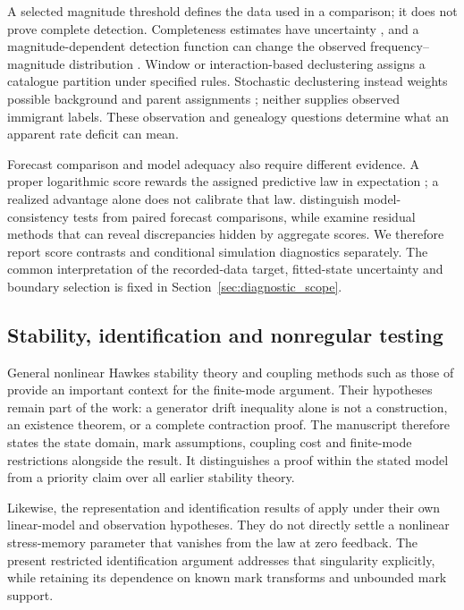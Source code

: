 A selected magnitude threshold defines the data used in a comparison; it does
not prove complete detection. Completeness estimates have uncertainty
\citep{WoessnerWiemer2005}, and a magnitude-dependent detection function can
change the observed frequency--magnitude distribution
\citep{Mignan2012}. Window or interaction-based declustering
\citep{GardnerKnopoff1974,Reasenberg1985} assigns a catalogue partition under
specified rules. Stochastic declustering instead weights possible background
and parent assignments \citep{ZhuangOgataVereJones2002}; neither supplies
observed immigrant labels. These observation and genealogy questions determine
what an apparent rate deficit can mean.

Forecast comparison and model adequacy also require different evidence.
A proper logarithmic score rewards the assigned predictive law in expectation
\citep{GneitingRaftery2007}; a realized advantage alone does not calibrate that
law. \citet{RhoadesEtAl2011} distinguish model-consistency tests from paired
forecast comparisons, while \citet{BraySchoenberg2013} examine residual
methods that can reveal discrepancies hidden by aggregate scores. We therefore
report score contrasts and conditional simulation diagnostics separately. The
common interpretation of the recorded-data target, fitted-state uncertainty
and boundary selection is fixed in Section~\ref{sec:diagnostic_scope}.

\subsection{Stability, identification and nonregular testing}

General nonlinear Hawkes stability theory \citep{BremaudMassoulie1996} and coupling methods such as those of \citet{HairerMattinglyScheutzow2011} provide an important context for the finite-mode argument. Their hypotheses remain part of the work: a generator drift inequality alone is not a construction, an existence theorem, or a complete contraction proof. The manuscript therefore states the state domain, mark assumptions, coupling cost and finite-mode restrictions alongside the result. It distinguishes a proof within the stated model from a priority claim over all earlier stability theory.

Likewise, the representation and identification results of \citet{DavisKresinBaeumerWang2026} apply under their own linear-model and observation hypotheses. They do not directly settle a nonlinear stress-memory parameter that vanishes from the law at zero feedback. The present restricted identification argument addresses that singularity explicitly, while retaining its dependence on known mark transforms and unbounded mark support.

